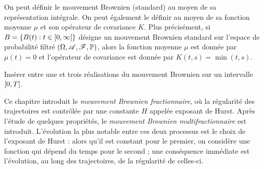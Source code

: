 On peut définir le mouvement Brownien (standard) au moyen de sa
représentation intégrale. On peut également le définir au moyen de sa
fonction moyenne $\mu$ et son opérateur de covariance $K$. Plus
précisément, si $B = \{B(t) : t \in \left[0,\infty\right[\}$ désigne un
mouvement Brownien standard sur l'espace de probabilité filtré
$\left(\Omega, \mathscr{A}, \mathscr{F}, \mathbb{P}\right)$, alors la fonction moyenne $\mu$
est donnée par $\mu(t) = 0$ et l'opérateur de covariance est donnée
par $K(t,s) = \min(t,s)$.

\begin{alert}
  Insérer entre une et trois réalisations du mouvement Brownien sur un
  intervalle $\left[0,T\right]$.
\end{alert}

Ce chapitre introduit le \emph{\og mouvement Brownien
  fractionnaire\fg{}}, où la régularité des trajectoires est contrôlée
par une constante $H$ appelée exposant de Hurst. Après l'étude de
quelques propriétés, le \emph{\og mouvement Brownien
  multifractionnaire\fg{}} est introduit. L'évolution la plus notable
entre ces deux processus est le choix de l'exposant de Hurst : alors
qu'il est constant pour le premier, on considère une fonction qui
dépend du temps pour le second ; une conséquence immédiate est
l'évolution, au long des trajectoires, de la régularité de celles-ci.
